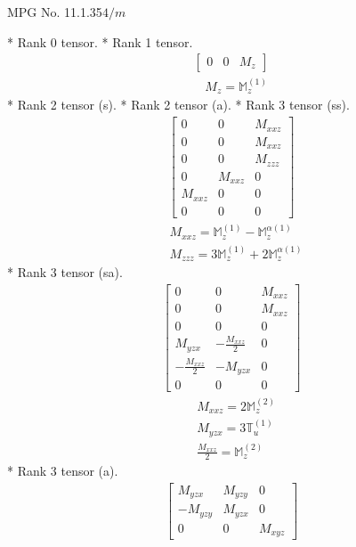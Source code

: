\documentclass[fleqn,8pt,landscape]{jsarticle}
\begin{document}
\setcounter{MaxMatrixCols}{32}

\renewcommand{\tablename}{Table~}
\renewcommand{\figurename}{Figure~}
\begin{center}
\LARGE
MPG No. 11.1.35\quad$4/m$
\end{center}
* Rank 0 tensor.
* Rank 1 tensor.
\begin{align*}
\begin{bmatrix} 0 & 0 & M_{z} \end{bmatrix}
\end{align*}
\begin{align*}
& M_{z} = \mathbb{M}_{z}^{(1)}
\end{align*}
* Rank 2 tensor (s).
* Rank 2 tensor (a).
* Rank 3 tensor (ss).
\begin{align*}
\begin{bmatrix} 0 & 0 & M_{xxz} \\ 0 & 0 & M_{xxz} \\ 0 & 0 & M_{zzz} \\ 0 & M_{xxz} & 0 \\ M_{xxz} & 0 & 0 \\ 0 & 0 & 0 \end{bmatrix}
\end{align*}
\begin{align*}
& M_{xxz} = \mathbb{M}_{z}^{(1)} - \mathbb{M}_{z}^{\alpha(1)} \\
& M_{zzz} = 3 \mathbb{M}_{z}^{(1)} + 2 \mathbb{M}_{z}^{\alpha(1)}
\end{align*}
* Rank 3 tensor (sa).
\begin{align*}
\begin{bmatrix} 0 & 0 & M_{xxz} \\ 0 & 0 & M_{xxz} \\ 0 & 0 & 0 \\ M_{yzx} & - \frac{M_{xxz}}{2} & 0 \\ - \frac{M_{xxz}}{2} & - M_{yzx} & 0 \\ 0 & 0 & 0 \end{bmatrix}
\end{align*}
\begin{align*}
& M_{xxz} = 2 \mathbb{M}_{z}^{(2)} \\
& M_{yzx} = 3 \mathbb{T}_{u}^{(1)} \\
& \frac{M_{xxz}}{2} = \mathbb{M}_{z}^{(2)}
\end{align*}
* Rank 3 tensor (a).
\begin{align*}
\begin{bmatrix} M_{yzx} & M_{yzy} & 0 \\ - M_{yzy} & M_{yzx} & 0 \\ 0 & 0 & M_{xyz} \end{bmatrix}
\end{align*}
\end{document}
